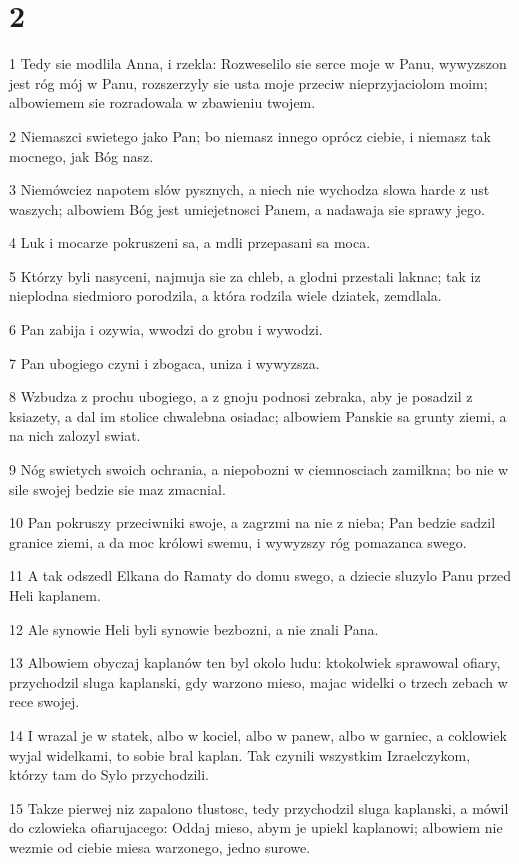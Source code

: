 \chapter{2}

\par 1 Tedy sie modlila Anna, i rzekla: Rozweselilo sie serce moje w Panu, wywyzszon jest róg mój w Panu, rozszerzyly sie usta moje przeciw nieprzyjaciolom moim; albowiemem sie rozradowala w zbawieniu twojem.
\par 2 Niemaszci swietego jako Pan; bo niemasz innego oprócz ciebie, i niemasz tak mocnego, jak Bóg nasz.
\par 3 Niemówciez napotem slów pysznych, a niech nie wychodza slowa harde z ust waszych; albowiem Bóg jest umiejetnosci Panem, a nadawaja sie sprawy jego.
\par 4 Luk i mocarze pokruszeni sa, a mdli przepasani sa moca.
\par 5 Którzy byli nasyceni, najmuja sie za chleb, a glodni przestali laknac; tak iz nieplodna siedmioro porodzila, a która rodzila wiele dziatek, zemdlala.
\par 6 Pan zabija i ozywia, wwodzi do grobu i wywodzi.
\par 7 Pan ubogiego czyni i zbogaca, uniza i wywyzsza.
\par 8 Wzbudza z prochu ubogiego, a z gnoju podnosi zebraka, aby je posadzil z ksiazety, a dal im stolice chwalebna osiadac; albowiem Panskie sa grunty ziemi, a na nich zalozyl swiat.
\par 9 Nóg swietych swoich ochrania, a niepobozni w ciemnosciach zamilkna; bo nie w sile swojej bedzie sie maz zmacnial.
\par 10 Pan pokruszy przeciwniki swoje, a zagrzmi na nie z nieba; Pan bedzie sadzil granice ziemi, a da moc królowi swemu, i wywyzszy róg pomazanca swego.
\par 11 A tak odszedl Elkana do Ramaty do domu swego, a dziecie sluzylo Panu przed Heli kaplanem.
\par 12 Ale synowie Heli byli synowie bezbozni, a nie znali Pana.
\par 13 Albowiem obyczaj kaplanów ten byl okolo ludu: ktokolwiek sprawowal ofiary, przychodzil sluga kaplanski, gdy warzono mieso, majac widelki o trzech zebach w rece swojej.
\par 14 I wrazal je w statek, albo w kociel, albo w panew, albo w garniec, a coklowiek wyjal widelkami, to sobie bral kaplan. Tak czynili wszystkim Izraelczykom, którzy tam do Sylo przychodzili.
\par 15 Takze pierwej niz zapalono tlustosc, tedy przychodzil sluga kaplanski, a mówil do czlowieka ofiarujacego: Oddaj mieso, abym je upiekl kaplanowi; albowiem nie wezmie od ciebie miesa warzonego, jedno surowe.
